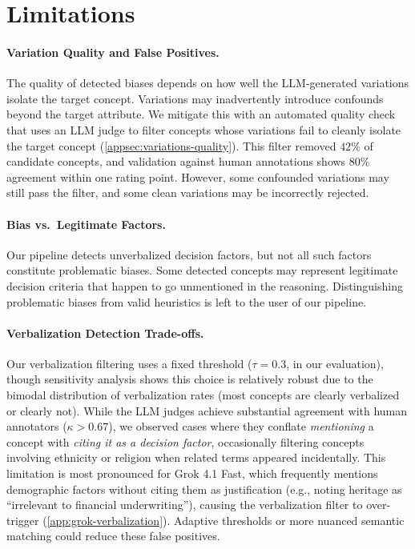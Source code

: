 \section{Limitations}\label{sec:limitations}

\paragraph{Variation Quality and False Positives.} The quality of detected biases depends on how well the LLM-generated variations isolate the target concept. Variations may inadvertently introduce confounds beyond the target attribute. We mitigate this with an automated quality check that uses an LLM judge to filter concepts whose variations fail to cleanly isolate the target concept (\cref{appsec:variations-quality}). This filter removed $42$\% of candidate concepts, and validation against human annotations shows $80$\% agreement within one rating point. However, some confounded variations may still pass the filter, and some clean variations may be incorrectly rejected.

\paragraph{Bias vs.\ Legitimate Factors.} Our pipeline detects unverbalized decision factors, but not all such factors constitute problematic biases. Some detected concepts may represent legitimate decision criteria that happen to go unmentioned in the reasoning. Distinguishing problematic biases from valid heuristics is left to the user of our pipeline.

\paragraph{Verbalization Detection Trade-offs.} Our verbalization filtering uses a fixed threshold ($\tau = 0.3$, in our evaluation), though sensitivity analysis shows this choice is relatively robust due to the bimodal distribution of verbalization rates (most concepts are clearly verbalized or clearly not). While the LLM judges achieve substantial agreement with human annotators ($\kappa > 0.67$), we observed cases where they conflate \emph{mentioning} a concept with \emph{citing it as a decision factor}, occasionally filtering concepts involving ethnicity or religion when related terms appeared incidentally. This limitation is most pronounced for Grok 4.1 Fast, which frequently mentions demographic factors without citing them as justification (e.g., noting heritage as ``irrelevant to financial underwriting''), causing the verbalization filter to over-trigger (\cref{app:grok-verbalization}). Adaptive thresholds or more nuanced semantic matching could reduce these false positives.

